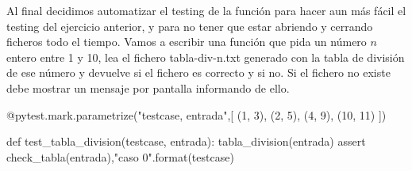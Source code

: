 \begin{ejercicio}
Al final decidimos automatizar el testing de la función
para hacer aun más fácil el testing del ejercicio anterior, y para no tener que estar abriendo y cerrando ficheros todo el tiempo. Vamos a escribir una función 
 que pida un número $n$ entero entre 1 y 10, lea el fichero tabla-div-n.txt generado con la tabla de división de ese número y devuelve 
 si el fichero es correcto y 
 si no.
Si el fichero no existe debe mostrar un mensaje por pantalla informando de ello.


\begin{python}
@pytest.mark.parametrize("testcase, entrada",[
(1, 3),
(2, 5),
(4, 9),
(10, 11)
])              

def test_tabla_division(testcase, entrada):
    tabla_division(entrada)
    assert check_tabla(entrada),"caso {0}".format(testcase)
\end{python}
\end{ejercicio}

